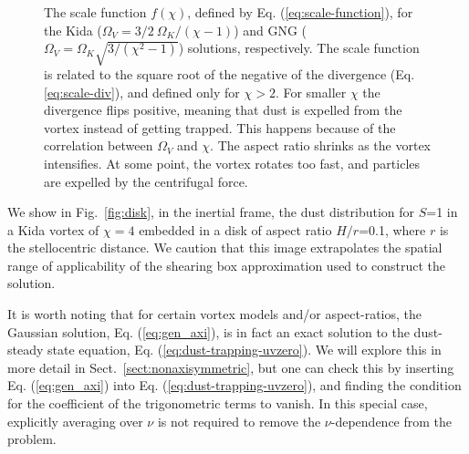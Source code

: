 \documentclass[apj]{emulateapj}
\newcommand{\Eq}[1]{Eq. (\ref{#1})}
\newcommand{\eq}[1]{\Eq{#1}}
\newcommand{\eqp}[1]{(Eq. \ref{#1})}
\newcommand{\Fig}[1]{Fig.~\ref{#1}}
\newcommand{\fig}[1]{\Fig{#1}}
\newcommand{\sect}[1]{Sect.~\ref{#1}}
\begin{document}
\begin{figure}
  \begin{center}
  \end{center}
\caption[]{The scale function $f(\chi)$, defined by
  \eq{eq:scale-function}, for the Kida ($\varOmega_V=3/2
  \ \varOmega_K/(\chi-1)$) and GNG ($\varOmega_V=\varOmega_K
  \sqrt{3/(\chi^2-1)}$) solutions, respectively. The scale function is
  related to the square root of the negative of the divergence
  \eqp{eq:scale-div}, and defined only for $\chi>2$. For smaller $\chi$ the
  divergence flips positive, meaning that dust is expelled from the
  vortex instead of getting trapped. This happens because of the
  correlation between $\varOmega_V$ and $\chi$. The aspect ratio shrinks
  as the vortex intensifies. At some point, the vortex rotates too
  fast, and particles are expelled by the centrifugal force.}
 \label{fig:scale-function}
\end{figure}

We show in \fig{fig:disk}, in the inertial frame, 
the dust distribution for $S$=1 in a Kida vortex of $\chi=4$ embedded in a 
disk of aspect ratio $H/r$=0.1, where $r$ is the stellocentric
distance. We caution that this image extrapolates the spatial
range of applicability of the shearing box approximation used to construct
the solution.

It is worth noting that for certain vortex models and/or
aspect-ratios, the Gaussian solution, \eq{eq:gen_axi}, is in fact an 
exact solution to the dust-steady state equation, \eq{eq:dust-trapping-uvzero}.  
We will explore this in more detail  in \sect{sect:nonaxisymmetric}, but one can check this by inserting
\eq{eq:gen_axi} into \eq{eq:dust-trapping-uvzero}, and finding the condition 
for the coefficient of the trigonometric terms to vanish. 
In this special case, explicitly averaging over $\nu$ is not
required to remove the $\nu$-dependence from the 
problem.
\end{document}
